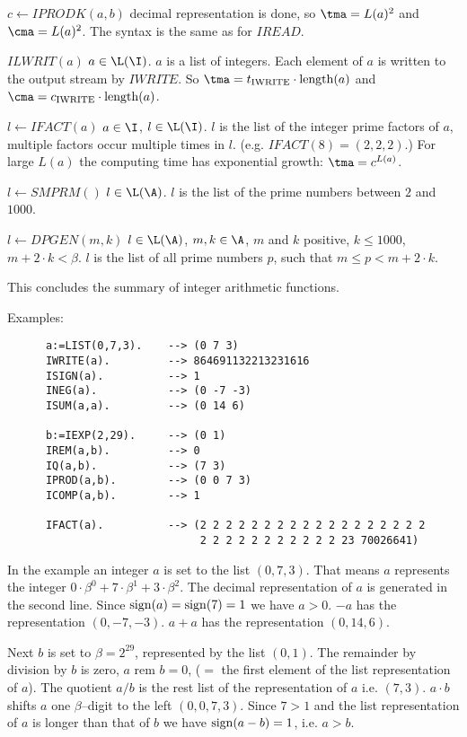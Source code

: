 \begin{deflist}{$c \gets IPRODK(a,b)$}
     decimal representation is done, so
     $\tma = L(a)^2$ and $\cma = L(a)^2$.
     The syntax is the same as for $IREAD$.
\item[$ILWRIT(a)$] $a \in \L(\I)$.
     $a$ is a list of integers. Each element of $a$ is written
     to the output stream by $IWRITE$.
     So $\tma = t_{\rm IWRITE} \cdot {\rm length}(a)$
     and $\cma = c_{\rm IWRITE} \cdot {\rm length}(a)$.
\item[$l \gets IFACT(a)$]  $a \in \I$, $l \in \L(\I)$.
     $l$ is the list of the integer prime factors of $a$, 
     multiple factors occur multiple times in $l$.
     (e.g. $IFACT(8) = (2,2,2)$.)
     For large $L(a)$ the computing time has
     exponential growth: $\tma = c^{L(a)}$.
\item[$l \gets SMPRM()$] $l \in \L(\A)$.
     $l$ is the list of the prime numbers between $2$ and $1000$.
\item[$l \gets DPGEN(m,k)$] $l \in \L(\A)$, 
     $m, k \in \A$, $m$ and $k$ positive, $k \leq 1000$, 
     $m + 2 \cdot k < \beta$.
     $l$ is the list of all prime numbers $p$, such that
     $m \leq p < m + 2 \cdot k$.    
\end{deflist}

This concludes the summary of 
integer arithmetic functions.

Examples:
\begin{verbatim}
      a:=LIST(0,7,3).    --> (0 7 3)
      IWRITE(a).         --> 864691132213231616
      ISIGN(a).          --> 1
      INEG(a).           --> (0 -7 -3)
      ISUM(a,a).         --> (0 14 6)

      b:=IEXP(2,29).     --> (0 1) 
      IREM(a,b).         --> 0
      IQ(a,b).           --> (7 3) 
      IPROD(a,b).        --> (0 0 7 3)
      ICOMP(a,b).        --> 1

      IFACT(a).          --> (2 2 2 2 2 2 2 2 2 2 2 2 2 2 2 2 2 2 
                              2 2 2 2 2 2 2 2 2 2 2 23 70026641)
\end{verbatim}
In the example
an integer $a$ is set to the list $(0,7,3)$.
That means $a$ represents the integer
$0 \cdot \beta^0 + 7 \cdot \beta^1 + 3 \cdot \beta^2$. 
The decimal representation of $a$ is generated in the 
second line.
Since ${\rm sign}(a) = {\rm sign}(7) = 1$ we have $a > 0$.
$-a$ has the representation  $(0,-7,-3)$.
$a+a$ has the representation $(0,14,6)$.

Next $b$ is set to $\beta = 2^{29}$, 
represented by the list $(0,1)$.
The remainder by division by $b$ is zero, $a$ rem $b = 0$,
($=$ the first element of the list representation of $a$).
The quotient $a/b$ is the rest list of the representation of $a$
i.e. $(7,3)$.
$a \cdot b$ shifts $a$ one $\beta$--digit to the left 
$(0,0,7,3)$.
Since $7 > 1$ and 
the list representation of $a$ is 
longer than that of $b$ we have 
${\rm sign}(a-b) = 1$, i.e. $a > b$.

